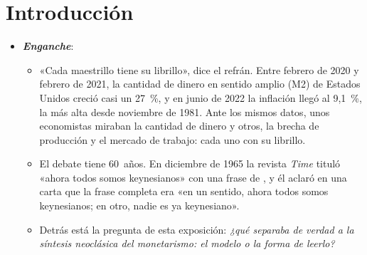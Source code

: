 \documentclass[11pt]{article}
\begin{document}
\tceetitulo

\section*{Introducción}

\begin{itemize}
\item \textbf{\emph{Enganche}}:
  \begin{itemize}
  \item «Cada maestrillo tiene su librillo», dice el refrán. Entre febrero de 2020 y febrero de 2021, la cantidad de dinero en sentido amplio (M2) de Estados Unidos creció casi un 27~\%\nocite{FRED2026M2SL}, y en junio de 2022 la inflación llegó al 9,1~\%, la más alta desde noviembre de 1981\nocite{BLS2026IPC}. Ante los mismos datos, unos economistas miraban la cantidad de dinero y otros, la brecha de producción y el mercado de trabajo: cada uno con su librillo.
  \item El debate tiene 60~años. En diciembre de 1965 la revista \emph{Time} tituló «ahora todos somos keynesianos» con una frase de \nocite{Time1965Keynesians}, y él aclaró en una carta que la frase completa era «en un sentido, ahora todos somos keynesianos; en otro, nadie es ya keynesiano»\nocite{Friedman1966Time}.
  \item Detrás está la pregunta de esta exposición: \emph{¿qué separaba de verdad a la síntesis neoclásica del monetarismo: el modelo o la forma de leerlo?}
  \end{itemize}


\end{itemize}
\end{document}

